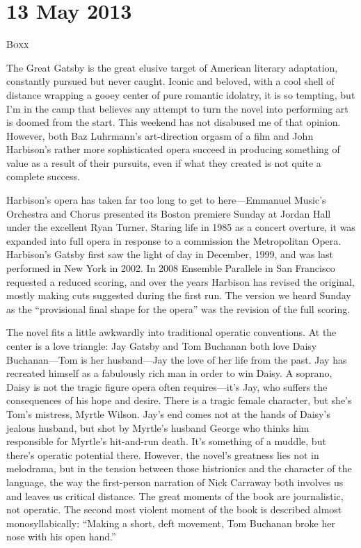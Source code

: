 \chapter{13 May 2013}

\textsc{Boxx}

The Great Gatsby is the great elusive target of American literary adaptation, constantly pursued but never caught. Iconic and beloved, with a cool shell of distance wrapping a gooey center of pure romantic idolatry, it is so tempting, but I’m in the camp that believes any attempt to turn the novel into performing art is doomed from the start. This weekend has not disabused me of that opinion. However, both Baz Luhrmann’s art-direction orgasm of a film and John Harbison’s rather more sophisticated opera succeed in producing something of value as a result of their pursuits, even if what they created is not quite a complete success.

Harbison’s opera has taken far too long to get to here—Emmanuel Music's Orchestra and Chorus presented its Boston premiere Sunday at Jordan Hall under the excellent Ryan Turner. Staring life in 1985 as a concert overture, it was expanded into full opera in response to a commission the Metropolitan Opera. Harbison’s Gatsby first saw the light of day in December, 1999, and was last performed in New York in 2002. In 2008 Ensemble Parallele in San Francisco requested a reduced scoring, and over the years Harbison has revised the original, mostly making cuts suggested during the first run. The version we heard Sunday as the “provisional final shape for the opera” was the revision of the full scoring.

The novel fits a little awkwardly into traditional operatic conventions. At the center is a love triangle: Jay Gatsby and Tom Buchanan both love Daisy Buchanan—Tom is her husband—Jay the love of her life from the past. Jay has recreated himself as a fabulously rich man in order to win Daisy. A soprano, Daisy is not the tragic figure opera often requires—it’s Jay, who suffers the consequences of his hope and desire. There is a tragic female character, but she’s Tom’s mistress, Myrtle Wilson. Jay’s end comes not at the hands of Daisy’s jealous husband, but shot by Myrtle’s husband George who thinks him responsible for Myrtle’s hit-and-run death. It’s something of a muddle, but there’s operatic potential there. However, the novel’s greatness lies not in melodrama, but in the tension between those histrionics and the character of the language, the way the first-person narration of Nick Carraway both involves us and leaves us critical distance. The great moments of the book are journalistic, not operatic. The second most violent moment of the book is described almost monosyllabically: “Making a short, deft movement, Tom Buchanan broke her nose with his open hand.”


